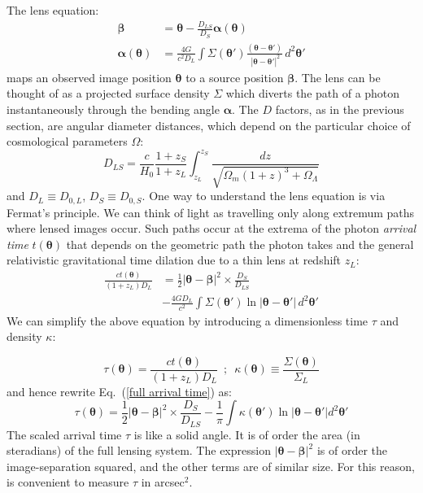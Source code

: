 \documentclass[galley,usenatbib]{mn2e}
\newcommand{\eqnref}[1] {Eq.~(\ref{#1})}
\renewcommand{\vec}[1]{\ensuremath{\boldsymbol{#1}}}
\begin{document}
The lens equation:
\begin{equation}
\begin{aligned}
\vec\beta &= \vec\theta - \frac{D_{LS}}{D_S}\vec\alpha(\vec\theta) \\
\vec\alpha(\vec\theta) &= \frac{4G}{c^2D_L} \int \Sigma(\vec\theta')
                          \frac{(\vec\theta - \vec\theta')}
                          {\ |\vec\theta - \vec\theta'|^2} \, d^2\vec\theta'
\end{aligned}
\label{eqn:lens_equation}
\end{equation}
maps an observed image position $\vec\theta$ to a source position
$\vec\beta$.  The lens can be thought of as a projected surface
density $\Sigma$ which diverts the path of a photon instantaneously
through the bending angle $\vec\alpha$.  The $D$ factors, as in the previous section, are angular
diameter distances, which depend on the particular choice of cosmological
parameters $\Omega$:
\begin{equation}
D_{LS} = \frac c{H_0} \frac{1+z_S}{1+z_L} \int_{z_L}^{z_S}
                      \frac{dz}{\sqrt{\Omega_m(1+z)^3 + \Omega_\Lambda}}
\end{equation}
%
and $D_L \equiv D_{0,L}$, $D_S \equiv D_{0,S}$.
One way to understand the lens equation is via Fermat's principle. We
can think of light as travelling only along extremum paths where
lensed images occur. Such paths occur at
the extrema of the photon {\it arrival time\/} $t(\vec\theta)$
that depends on the geometric path the photon takes and the general
relativistic gravitational time dilation due to a thin lens at
redshift $z_L$:
\begin{equation}
\begin{aligned}
\frac{ct(\vec\theta)}{(1+z_L)D_{L}}
&= {\textstyle\frac12} |\vec\theta - \vec\beta|^2
   \times \frac{D_{S}}{D_{LS}} \\
&- \frac{4GD_L}{c^2}
   \int \Sigma(\vec\theta') \ln |\vec\theta-\vec\theta'| \, d^2\vec\theta'
\label{full arrival time}
\end{aligned}
\end{equation}
We can simplify the above equation by introducing a dimensionless time $\tau$ and density $\kappa$: 

\begin{equation}
\tau(\vec\theta) = \frac{ct(\vec\theta)}{(1+z_L)D_{L}} \,\,\,;\,\,\, \kappa(\vec\theta) \equiv \frac{\Sigma(\vec\theta)}{\Sigma_L}
\end{equation}
and hence rewrite \eqnref{full arrival time} as:
\begin{equation}
\tau(\vec\theta) = {\textstyle\frac12} |\vec\theta - \vec\beta|^2
                   \times \frac{D_{S}}{D_{LS}}
                 - \frac1\pi \int \kappa (\vec\theta')
                   \ln|\vec\theta - \vec\theta'| d^2\vec\theta'
\label{arrival time}
\end{equation}
The scaled arrival time $\tau$ is like a solid angle. It is of order
the area (in steradians) of the full lensing system. The expression
$|\vec\theta - \vec\beta|^2$ is of order the image-separation
squared, and the other terms are of similar size.  For this reason, is
convenient to measure $\tau$ in arcsec$^{2}$.
\end{document}
